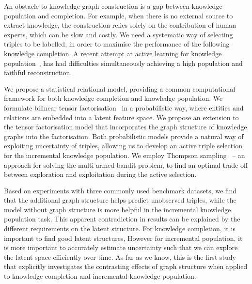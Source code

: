An obstacle to knowledge graph construction is a gap between knowledge
population and completion. For example, when there is no external source to extract knowledge,
the construction relies solely on the contribution of human experts, which can be slow and costly.
We need a systematic way of selecting triples to be labelled, in order to maximise the performance of the following knowledge completion.
A recent attempt at active learning for knowledge population~\cite{kajino2015active},
has had difficulties simultaneously achieving a high population and faithful reconstruction.

We propose a statistical relational model, providing a common computational framework
for both knowledge completion and knowledge population.
We formulate bilinear tensor factorisation~\cite{nickel2011three} in a probabilistic way, where entities and relations are embedded into a latent feature space. We propose an extension to the tensor factorisation model that incorporates the graph structure of knowledge graphs into the factorisation. Both probabilistic models provide a natural way of exploiting uncertainty of triples, allowing us to develop
an active triple selection for the incremental knowledge population.
We employ Thompson sampling~\cite{scott10bandit} -- an approach for solving the multi-armed bandit problem,
to find an optimal trade-off between exploration and exploitation during the active selection.

Based on experiments with three commonly used benchmark datasets, we find that the additional graph structure helps predict unobserved triples, while the model without graph structure is more helpful in the incremental knowledge population task.
This apparent contradiction in results can be explained by the different requirements on
the latent structure. For knowledge completion, it is important to find good latent structures,
However for incremental population, it is more important to accurately estimate uncertainty
such that we can explore the latent space efficiently over time.
As far as we know, this is the first study that explicitly investigates the contrasting
effects of graph structure when applied to knowledge completion and incremental knowledge population.

